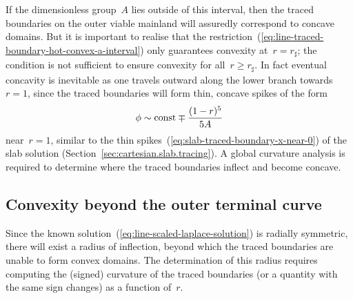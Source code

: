 If the dimensionless group~$A$ lies outside of this interval,
then the traced boundaries on the outer viable mainland
will assuredly correspond to concave domains.
But it is important to realise that
the restriction~(\ref{eq:line-traced-boundary-hot-convex-a-interval})
only guarantees convexity at~$r = r_\sharp$;
the condition is not sufficient to ensure convexity for all~$r \ge r_\sharp$.
In fact eventual concavity is inevitable
as one travels outward along the lower branch towards~$r = 1$,
since the traced boundaries will form thin, concave spikes of the form
\begin{equation}
  \phi \sim \mathrm{const} \mp \frac{(1 - r)^5}{5 A}
  \label{eq:line-traced-boundary-r-near-1}
\end{equation}
near~$r = 1$,
similar to the thin spikes~(\ref{eq:slab-traced-boundary-x-near-0})
of the slab solution (Section~\ref{sec:cartesian.slab.tracing}).
A global curvature analysis is required
to determine where the traced boundaries inflect
and become concave.

\subsection{Convexity beyond the outer terminal curve}
\label{sec:line.convex.beyond}

Since the known solution~(\ref{eq:line-scaled-laplace-solution})
is radially symmetric,
there will exist a radius of inflection,
beyond which the traced boundaries are unable to form convex domains.
The determination of this radius requires
computing the (signed) curvature of the traced boundaries
(or a quantity with the same sign changes)
as a function of~$r$.

